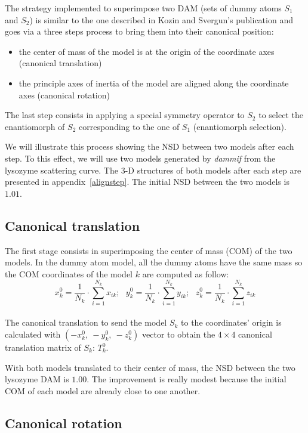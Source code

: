 \documentclass[a4paper, 11pt]{report}
\begin{document}
The strategy implemented to superimpose two DAM (sets of
dummy atoms $S_{1}$ and $S_{2}$) is similar to the one described in 
Kozin and Svergun's publication \cite{supcomb} and goes via a three 
steps process to bring them into their canonical position:
\begin{itemize}
  \item the center of mass of the model is at the origin of the 
        coordinate axes (canonical translation)
  \item the principle axes of inertia of the model are aligned along 
        the coordinate axes (canonical rotation)
\end{itemize}
The last step consists in applying a special symmetry operator to 
$S_{2}$ to select the enantiomorph of $S_{2}$ corresponding to the one 
of $S_{1}$ (enantiomorph selection).

We will illustrate this process showing the NSD between two models 
after each step. 
To this effect, we will use two models generated by \textit{dammif} 
from the lysozyme scattering curve. 
The 3-D structures of both models after each step are presented in 
appendix~\ref{alignstep}.
The initial NSD between the two models is $1.01$.

\subsection{Canonical translation}

The first stage consists in superimposing the center of mass (COM) of 
the two models. 
In the dummy atom model, all the dummy atoms have the same mass so the 
COM coordinates of the model $k$ are computed as follow:
\[
x_{k}^0 = \frac{1}{N_{k}} \cdot \sum\limits_{i=1}^{N_{k}} x_{ik};\ \ \ 
y_{k}^0 = \frac{1}{N_{k}} \cdot \sum\limits_{i=1}^{N_{k}} y_{ik};\ \ \ 
z_{k}^0 = \frac{1}{N_{k}} \cdot \sum\limits_{i=1}^{N_{k}} z_{ik}
\]\\
The canonical translation to send the model $S_{k}$ to the coordinates' 
origin is calculated with $(-x_{k}^0,\ -y_{k}^0,\ -z_{k}^0)$ vector to 
obtain the $4 \times 4$ canonical translation matrix of $S_{k}$: 
$T_{k}^0$.

With both models translated to their center of mass, the NSD between 
the two lysozyme DAM is $1.00$. 
The improvement is really modest because the initial COM of each model 
are already close to one another.

\subsection{Canonical rotation}
\end{document}
